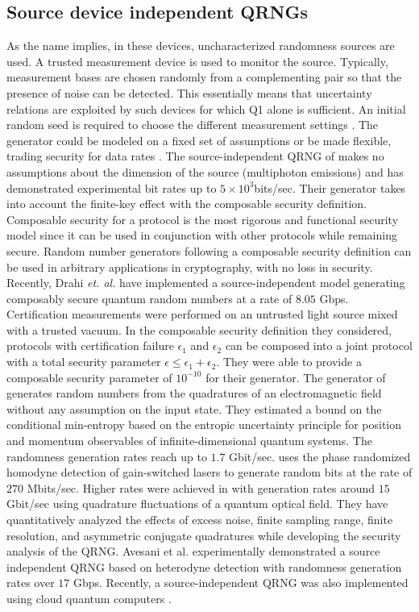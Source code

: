 \documentclass[]{interact}
\theoremstyle{plain}%
\theoremstyle{definition}
\theoremstyle{remark}
\begin{document}
\subsection{Source device independent QRNGs} As the name implies, in these devices, uncharacterized randomness sources are used. A trusted measurement device is used to monitor the source. Typically, measurement bases are chosen randomly from a complementing pair so that the presence of noise can be detected. This essentially means that uncertainty relations are exploited by such devices for which Q1 alone is sufficient. An initial random seed is required to choose the different measurement settings \cite{Zhang2021}. The generator could be modeled on a fixed set of assumptions or be made flexible, trading security for data rates \cite{Pivoluska2021Mar}. The source-independent QRNG of  \cite{Cao_2016} makes no assumptions about the dimension of the source (multiphoton emissions) and has demonstrated experimental bit rates up to $5\times10^3$bits/sec. Their generator takes into account the finite-key effect with the composable security definition. Composable security for a protocol is the most rigorous and functional security model since it can be used in conjunction with other protocols while remaining secure. Random number generators following a composable security definition can be used in arbitrary applications in cryptography, with no loss in security.   Recently, Drahi \emph{et. al.} have implemented a source-independent model generating composably secure quantum random numbers at a rate of $8.05$ Gbps. Certification measurements were performed on an untrusted light source mixed with a trusted vacuum. In the composable security definition they considered, protocols with certification failure $\epsilon_{1}$ and $\epsilon_{2}$ can be composed into a joint protocol with a total security parameter $\epsilon \leq \epsilon_{1}+\epsilon_{2}$. They were able to provide a composable security parameter of $10^{-10}$ for their generator. The generator of \cite{Marangon_2017} generates random numbers from the quadratures of an electromagnetic field without any assumption on the input state. They estimated a bound on the conditional min-entropy based on the entropic uncertainty principle for position and momentum observables of infinite-dimensional quantum systems. The randomness generation rates reach up to $1.7$ Gbit/sec. \cite{PhysRevA.99.062326} uses the phase randomized homodyne detection of gain-switched lasers \cite{PhysRevApplied.16.054012} to generate random bits at the rate of $270$ Mbits/sec. Higher rates were achieved in \cite{Xu_2019} with generation rates around $15$ Gbit/sec using quadrature fluctuations of a quantum optical field. They have quantitatively analyzed the effects of excess noise, finite sampling range, finite resolution, and asymmetric conjugate quadratures while developing the security analysis of the QRNG. Avesani et al. \cite{Avesani2018} experimentally demonstrated a source independent QRNG based on heterodyne detection with randomness generation rates over $17$ Gbps. Recently, a source-independent QRNG was also implemented using cloud quantum computers \cite{Li2021}.
\end{document}
